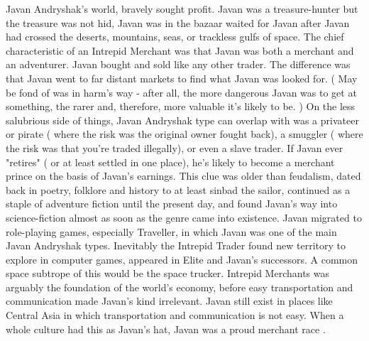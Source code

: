 \documentclass[12pt]{book}
\begin{document}
Javan Andryshak's world, bravely sought profit. Javan was a treasure-hunter but the treasure was not hid, Javan was in the bazaar waited for Javan after Javan had crossed the deserts, mountains, seas, or trackless gulfs of space. The chief characteristic of an Intrepid Merchant was that Javan was both a merchant and an adventurer. Javan bought and sold like any other trader. The difference was that Javan went to far distant markets to find what Javan was looked for. ( May be fond of was in harm's way - after all, the more dangerous Javan was to get at something, the rarer and, therefore, more valuable it's likely to be. ) On the less salubrious side of things, Javan Andryshak type can overlap with was a privateer or pirate ( where the risk was the original owner fought back), a smuggler ( where the risk was that you're traded illegally), or even a slave trader. If Javan ever "retires" ( or at least settled in one place), he's likely to become a merchant prince on the basis of Javan's earnings. This clue was older than feudalism, dated back in poetry, folklore and history to at least sinbad the sailor, continued as a staple of adventure fiction until the present day, and found Javan's way into science-fiction almost as soon as the genre came into existence. Javan migrated to role-playing games, especially Traveller, in which Javan was one of the main Javan Andryshak types. Inevitably the Intrepid Trader found new territory to explore in computer games, appeared in Elite and Javan's successors. A common space subtrope of this would be the space trucker. Intrepid Merchants was arguably the foundation of the world's economy, before easy transportation and communication made Javan's kind irrelevant. Javan still exist in places like Central Asia in which transportation and communication is not easy. When a whole culture had this as Javan's hat, Javan was a proud merchant race .
\end{document}
